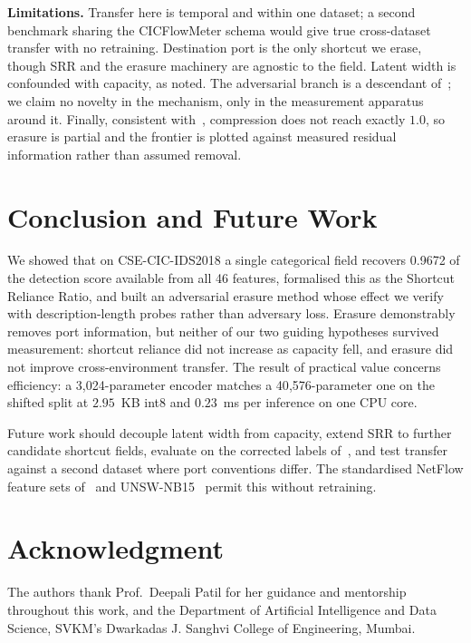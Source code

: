 \documentclass[conference]{IEEEtran}
\newcommand{\SRRratio}{0.9672}
\newcommand{\paramsS}{3{,}024}
\newcommand{\paramsL}{40{,}576}
\begin{document}
\textbf{Limitations.} Transfer here is temporal and within one dataset; a second benchmark
sharing the CICFlowMeter schema would give true cross-dataset transfer with no retraining.
Destination port is the only shortcut we erase, though SRR and the erasure machinery are
agnostic to the field. Latent width is confounded with capacity, as noted. The adversarial
branch is a descendant of~\cite{ganin2016dann}; we claim no novelty in the mechanism, only
in the measurement apparatus around it. Finally, consistent with~\cite{kumar2022probing},
compression does not reach exactly $1.0$, so erasure is partial and the frontier is plotted
against measured residual information rather than assumed removal.

\section{Conclusion and Future Work}
We showed that on CSE-CIC-IDS2018 a single categorical field recovers \SRRratio{} of the
detection score available from all 46 features, formalised this as the Shortcut Reliance
Ratio, and built an adversarial erasure method whose effect we verify with description-length
probes rather than adversary loss. Erasure demonstrably removes port information, but neither
of our two guiding hypotheses survived measurement: shortcut reliance did not increase as
capacity fell, and erasure did not improve cross-environment transfer. The result of
practical value concerns efficiency: a \paramsS-parameter encoder matches a
\paramsL-parameter one on the shifted split at $2.95$~KB int8 and $0.23$~ms per inference on one CPU core.

Future work should decouple latent width from capacity, extend SRR to further candidate
shortcut fields, evaluate on the corrected labels of~\cite{liu2022error}, and test transfer
against a second dataset where port conventions differ. The standardised NetFlow feature
sets of~\cite{sarhan2021netflow} and UNSW-NB15~\cite{moustafa2015unsw} permit this without
retraining.

\section*{Acknowledgment}
The authors thank Prof.\ Deepali Patil for her guidance and mentorship throughout this
work, and the Department of Artificial Intelligence and Data Science, SVKM's Dwarkadas J.
Sanghvi College of Engineering, Mumbai.

\balance


\end{document}
